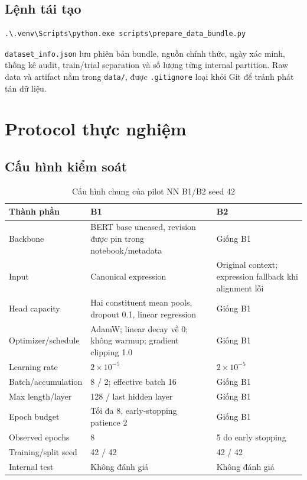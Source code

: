 \documentclass[11pt,a4paper]{article}
\newcommand{\code}[1]{\nolinkurl{#1}}
\begin{document}
\subsection{Lệnh tái tạo}

\begin{verbatim}
.\.venv\Scripts\python.exe scripts\prepare_data_bundle.py
\end{verbatim}

\code{dataset_info.json} lưu phiên bản bundle, nguồn chính thức, ngày xác minh, thống kê audit, train/trial separation và số lượng từng internal partition. Raw data và artifact nằm trong \code{data/}, được \code{.gitignore} loại khỏi Git để tránh phát tán dữ liệu.

\section{Protocol thực nghiệm}

\subsection{Cấu hình kiểm soát}

\begin{table}[htbp]
\centering
\caption{Cấu hình chung của pilot NN B1/B2 seed 42}
\small
\begin{tabularx}{\textwidth}{@{}p{}YY@{}}
\toprule
Thành phần & B1 & B2 \\
\midrule
Backbone & BERT base uncased, revision được pin trong notebook/metadata & Giống B1 \\
Input & Canonical expression & Original context; expression fallback khi alignment lỗi \\
Head capacity & Hai constituent mean pools, dropout 0.1, linear regression & Giống B1 \\
Optimizer/schedule & AdamW; linear decay về 0; không warmup; gradient clipping 1.0 & Giống B1 \\
Learning rate & $2\times10^{-5}$ & $2\times10^{-5}$ \\
Batch/accumulation & 8 / 2; effective batch 16 & Giống B1 \\
Max length/layer & 128 / last hidden layer & Giống B1 \\
Epoch budget & Tối đa 8, early-stopping patience 2 & Giống B1 \\
Observed epochs & 8 & 5 do early stopping \\
Training/split seed & 42 / 42 & 42 / 42 \\
Internal test & Không đánh giá & Không đánh giá \\
\bottomrule
\end{tabularx}
\end{table}
\end{document}
